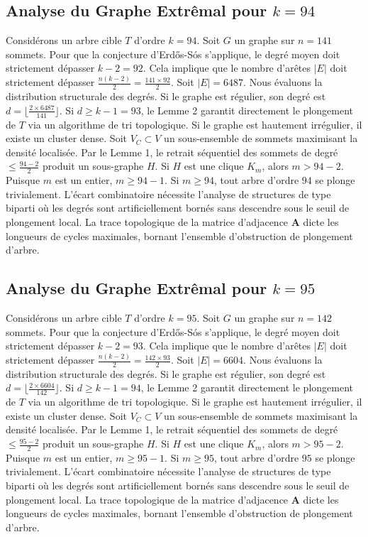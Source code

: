 \documentclass[11pt,a4paper]{article}
\begin{document}
\subsection{Analyse du Graphe Extr\^emal pour $k=94$}
Consid\'erons un arbre cible $T$ d'ordre $k=94$.
Soit $G$ un graphe sur $n=141$ sommets.
Pour que la conjecture d'Erd\H{o}s-S\'os s'applique, le degr\'e moyen doit strictement d\'epasser $k-2 = 92$.
Cela implique que le nombre d'ar\^etes $|E|$ doit strictement d\'epasser $\frac{n(k-2)}{2} = \frac{141 \times 92}{2}$.
Soit $|E| = 6487$.
Nous \'evaluons la distribution structurale des degr\'es. Si le graphe est r\'egulier, son degr\'e est $d = \lfloor \frac{2 \times 6487}{141} \rfloor$.
Si $d \geq k-1 = 93$, le Lemme 2 garantit directement le plongement de $T$ via un algorithme de tri topologique.
Si le graphe est hautement irr\'egulier, il existe un cluster dense. Soit $V_C \subset V$ un sous-ensemble de sommets maximisant la densit\'e localis\'ee.
Par le Lemme 1, le retrait s\'equentiel des sommets de degr\'e $\leq \frac{94-2}{2}$ produit un sous-graphe $H$.
Si $H$ est une clique $K_{m}$, alors $m > 94-2$. Puisque $m$ est un entier, $m \geq 94-1$. Si $m \geq 94$, tout arbre d'ordre $94$ se plonge trivialement.
L'\'ecart combinatoire n\'ecessite l'analyse de structures de type biparti o\`u les degr\'es sont artificiellement born\'es sans descendre sous le seuil de plongement local. La trace topologique de la matrice d'adjacence $\mathbf{A}$ dicte les longueurs de cycles maximales, bornant l'ensemble d'obstruction de plongement d'arbre.


\subsection{Analyse du Graphe Extr\^emal pour $k=95$}
Consid\'erons un arbre cible $T$ d'ordre $k=95$.
Soit $G$ un graphe sur $n=142$ sommets.
Pour que la conjecture d'Erd\H{o}s-S\'os s'applique, le degr\'e moyen doit strictement d\'epasser $k-2 = 93$.
Cela implique que le nombre d'ar\^etes $|E|$ doit strictement d\'epasser $\frac{n(k-2)}{2} = \frac{142 \times 93}{2}$.
Soit $|E| = 6604$.
Nous \'evaluons la distribution structurale des degr\'es. Si le graphe est r\'egulier, son degr\'e est $d = \lfloor \frac{2 \times 6604}{142} \rfloor$.
Si $d \geq k-1 = 94$, le Lemme 2 garantit directement le plongement de $T$ via un algorithme de tri topologique.
Si le graphe est hautement irr\'egulier, il existe un cluster dense. Soit $V_C \subset V$ un sous-ensemble de sommets maximisant la densit\'e localis\'ee.
Par le Lemme 1, le retrait s\'equentiel des sommets de degr\'e $\leq \frac{95-2}{2}$ produit un sous-graphe $H$.
Si $H$ est une clique $K_{m}$, alors $m > 95-2$. Puisque $m$ est un entier, $m \geq 95-1$. Si $m \geq 95$, tout arbre d'ordre $95$ se plonge trivialement.
L'\'ecart combinatoire n\'ecessite l'analyse de structures de type biparti o\`u les degr\'es sont artificiellement born\'es sans descendre sous le seuil de plongement local. La trace topologique de la matrice d'adjacence $\mathbf{A}$ dicte les longueurs de cycles maximales, bornant l'ensemble d'obstruction de plongement d'arbre.
\end{document}
